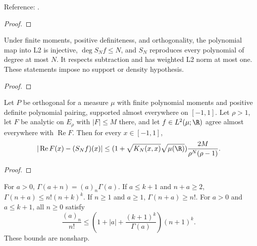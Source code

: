\begin{supporting}
\begin{theorem}
Reference: \cite[Theorem 8.2]{atap}.
\end{theorem}
\begin{proof}
\leanok
\end{proof}

\begin{theorem}
\label{thm:weighted-projection}
\leanok
Under finite moments, positive definiteness, and orthogonality, the polynomial
map into L2 is injective, $\deg S_Nf\le N$, and $S_N$ reproduces every polynomial
of degree at most $N$. It respects subtraction and has weighted L2 norm at most
one. These statements impose no support or density hypothesis.
\end{theorem}
\begin{proof}
\leanok
\end{proof}

\begin{theorem}
\label{thm:analytic-kernel-error}
\leanok
Let $P$ be orthogonal for a measure $\mu$ with finite polynomial moments and positive definite polynomial pairing, supported almost everywhere on $[-1,1]$. Let $\rho>1$, let $F$ be analytic on $E_\rho$ with $|F|\le M$ there, and let $f\in L^2(\mu;\R)$ agree almost everywhere with $\operatorname{Re}F$. Then for every
$x\in[-1,1]$,
\[ |\operatorname{Re}F(x)-(S_Nf)(x)|\le
 (1+\sqrt{K_N(x,x)}\sqrt{\mu(\R)})
 \frac{2M}{\rho^N(\rho-1)}. \]

\end{theorem}
\begin{proof}
\leanok
\end{proof}


\begin{theorem}
\label{thm:gamma-polynomial-growth}
\leanok
For $a>0$, $\Gamma(a+n)=(a)_n\Gamma(a)$. If $a\le k+1$ and $n+a\ge2$,
$\Gamma(n+a)\le n!(n+k)^k$. If $n\ge1$ and $a\ge1$,
$\Gamma(n+a)\ge n!$. For $a>0$ and $a\le k+1$, all $n\ge0$ satisfy
\[ \frac{(a)_n}{n!}\le
 \left(1+|a|+\frac{(k+1)^k}{\Gamma(a)}\right)(n+1)^k. \]
These bounds are nonsharp.


\end{theorem}
\end{supporting}
